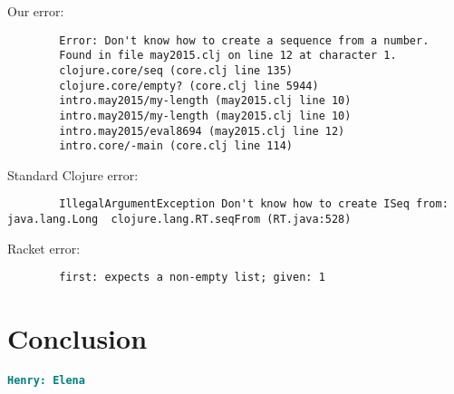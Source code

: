 \documentclass[12pt]{article}
\newcommand{\comment}[1]{{\bf \tt  {#1}}}
\newcommand{\hfcomment}[1]{\textcolor{Teal}{\comment{Henry: {#1}}}}
\begin{document}
	Our error:
	\begin{verbatim}
		Error: Don't know how to create a sequence from a number.
		Found in file may2015.clj on line 12 at character 1.
        clojure.core/seq (core.clj line 135)
        clojure.core/empty? (core.clj line 5944)
        intro.may2015/my-length (may2015.clj line 10)
        intro.may2015/my-length (may2015.clj line 10)
        intro.may2015/eval8694 (may2015.clj line 12)
        intro.core/-main (core.clj line 114)
			\end{verbatim}

	Standard Clojure error:
	\begin{verbatim}
		IllegalArgumentException Don't know how to create ISeq from: java.lang.Long  clojure.lang.RT.seqFrom (RT.java:528)
	\end{verbatim}


	Racket error:
	\begin{verbatim}
		first: expects a non-empty list; given: 1
	\end{verbatim}




\section{Conclusion}\label{sec:conclusion}
	\hfcomment{Elena}




\end{document}
